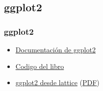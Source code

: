 \documentclass[xcolor={usenames,svgnames,dvipsnames}]{beamer}
\begin{document}
\subsection{ggplot2}
\label{sec-2-2}
\begin{frame}
\frametitle{ggplot2}
\label{sec-2-2-1}

\begin{itemize}
\item \href{http://docs.ggplot2.org/current/}{Documentación de ggplot2}
\item \href{http://ggplot2.org/book/}{Codigo del libro}
\item \href{http://learnr.wordpress.com/2009/06/28/ggplot2-version-of-figures-in-lattice-multivariate-data-visualization-with-r-part-1/}{ggplot2 desde lattice} (\href{http://learnr.files.wordpress.com/2009/08/latbook.pdf}{PDF})
\end{itemize}
\end{frame}
\end{document}
